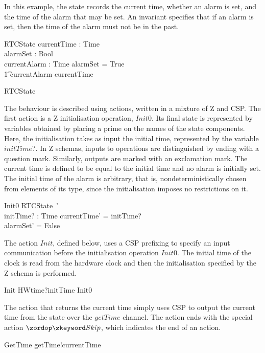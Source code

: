 %
In this example, the state records the current time, whether an alarm
is set, and the time of the alarm that may be set.
An invariant specifies that if an alarm is set, then the time of the
alarm must not be in the past.
%
\begin{schema}{RTCState}
  currentTime  : Time \\
  alarmSet     : Bool \\
  currentAlarm : Time
\where
  alarmSet = True \implies \\
  \t1 currentAlarm \geq currentTime
\end{schema}
\begin{circusaction}
  \circstate RTCState
\end{circusaction}
%
The behaviour is described using actions, written in a mixture of Z
and CSP.
The first action is a Z initialisation operation, $Init0$.
Its final state is represented by variables obtained by placing a
prime on the names of the state components.
Here, the initialisation takes as input the initial time, represented
by the variable $initTime?$.
In Z schemas, inputs to operations are distinguished by ending with a
question mark.
Similarly, outputs are marked with an exclamation mark.
The current time is defined to be equal to the initial time and no
alarm is initially set.
The initial time of the alarm is arbitrary, that is,
nondeterministically chosen from elements of its type, since the
initialisation imposes no restrictions on it.
%
\begin{schema}{Init0}
  RTCState~' \\
  initTime? : Time
\where 
  currentTime' = initTime? \\
  alarmSet' = False
\end{schema}
%
The action $Init$, defined below, uses a CSP prefixing to specify an
input communication before the initialisation operation $Init0$.
The initial time of the clock is read from the hardware clock and then
the initialisation specified by the Z schema is performed.
%
\begin{circusaction}
  Init \circdef HWtime?initTime \then Init0
\end{circusaction}
%
The action that returns the current time simply uses CSP to output the
current time from the state over the $getTime$ channel.
The action ends with the special action $\Skip$, which indicates the
end of an action.
%
\begin{circusaction}
  GetTime \circdef getTime!currentTime \then \Skip
\end{circusaction}
